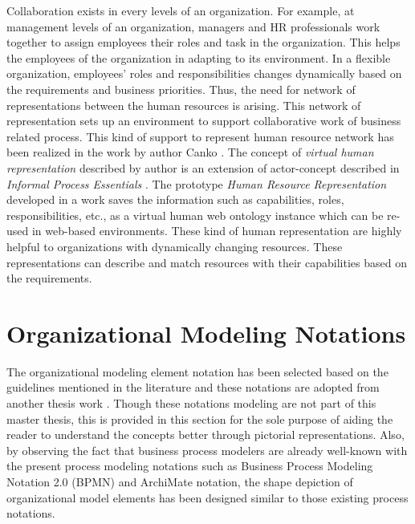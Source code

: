 Collaboration exists in every levels of an organization. For example, at management levels of an organization, managers and HR professionals work together to assign employees their roles and task in the organization. This helps the employees of the organization in adapting to its environment. In a flexible organization, employees' roles and responsibilities changes dynamically based on the requirements and business priorities. Thus, the need for network of representations between the human resources is arising. This network of representation sets up an environment to support collaborative work of business related process. This kind of support to represent human resource network has been realized in the work by author Canko \cite{Canko2015}. The concept of \textit{virtual human representation} described by author is an extension of actor-concept described in \textit{Informal Process Essentials} \cite{Sungur2014a}. The prototype \textit{Human Resource Representation} developed in a work \cite{Canko2015} saves the information such as capabilities, roles, responsibilities, etc., as a virtual human web ontology instance which can be re-used in web-based environments. These kind of human representation are highly helpful to organizations with dynamically changing resources. These representations can describe and match resources with their capabilities based on the requirements.

\section{Organizational Modeling Notations}
\label{sec:resourcecentricorganizationalmodeling}
The organizational modeling element notation has been selected based on the guidelines mentioned in the literature \cite{Moody2009} and these notations are adopted from another thesis work \cite{Sierr2015}. Though these notations modeling are not part of this master thesis, this is provided in this section for the sole purpose of aiding the reader to understand the concepts better through pictorial representations. Also, by observing  the fact that business process modelers are already well-known with the present process modeling notations such as Business Process Modeling Notation 2.0 (BPMN) \cite{bpm2011} and ArchiMate notation\cite{arc2013}, the shape depiction of organizational model elements has been designed similar to those existing process notations. 

